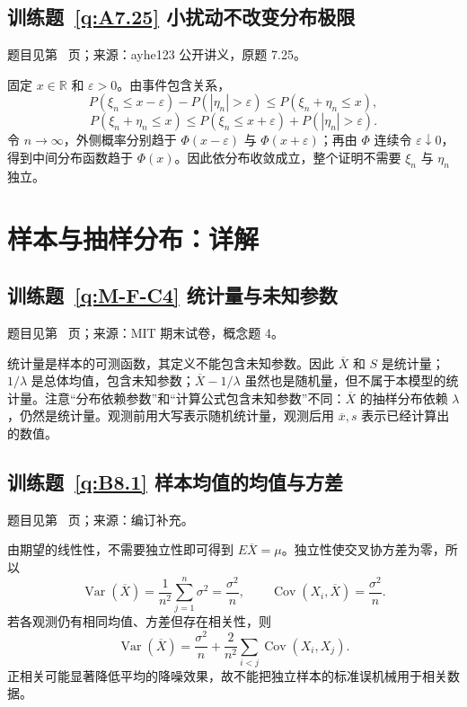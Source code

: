 \subsection*{训练题~\ref{q:A7.25} 小扰动不改变分布极限}\label{a:A7.25}{\small 题目见第~\pageref{q:A7.25} 页；来源：ayhe123 公开讲义，原题 7.25。}
\begin{solve}固定 $x\in\mathbb R$ 和 $\varepsilon>0$。由事件包含关系，\[P(\xi_n\le x-\varepsilon)-P(|\eta_n|>\varepsilon)\le P(\xi_n+\eta_n\le x),\]\[P(\xi_n+\eta_n\le x)\le P(\xi_n\le x+\varepsilon)+P(|\eta_n|>\varepsilon).\]令 $n\to\infty$，外侧概率分别趋于 $\Phi(x-\varepsilon)$ 与 $\Phi(x+\varepsilon)$；再由 $\Phi$ 连续令 $\varepsilon\downarrow0$，得到中间分布函数趋于 $\Phi(x)$。因此依分布收敛成立，整个证明不需要 $\xi_n$ 与 $\eta_n$ 独立。\end{solve}

\clearpage\section*{样本与抽样分布：详解}

\subsection*{训练题~\ref{q:M-F-C4} 统计量与未知参数}\label{a:M-F-C4}{\small 题目见第~\pageref{q:M-F-C4} 页；来源：MIT 期末试卷，概念题 4。}
\begin{solve}统计量是样本的可测函数，其定义不能包含未知参数。因此 $\overline X$ 和 $S$ 是统计量；$1/\lambda$ 是总体均值，包含未知参数；$\overline X-1/\lambda$ 虽然也是随机量，但不属于本模型的统计量。注意“分布依赖参数”和“计算公式包含未知参数”不同：$\overline X$ 的抽样分布依赖 $\lambda$，仍然是统计量。观测前用大写表示随机统计量，观测后用 $\overline x,s$ 表示已经计算出的数值。\end{solve}

\subsection*{训练题~\ref{q:B8.1} 样本均值的均值与方差}\label{a:B8.1}{\small 题目见第~\pageref{q:B8.1} 页；来源：编订补充。}
\begin{solve}由期望的线性性，不需要独立性即可得到 $E\overline X=\mu$。独立性使交叉协方差为零，所以\[\operatorname{Var}(\overline X)=\frac{1}{n^2}\sum_{j=1}^n\sigma^2=\frac{\sigma^2}{n},\qquad\operatorname{Cov}(X_i,\overline X)=\frac{\sigma^2}{n}.\]若各观测仍有相同均值、方差但存在相关性，则\[\operatorname{Var}(\overline X)=\frac{\sigma^2}{n}+\frac{2}{n^2}\sum_{i<j}\operatorname{Cov}(X_i,X_j).\]正相关可能显著降低平均的降噪效果，故不能把独立样本的标准误机械用于相关数据。\end{solve}


